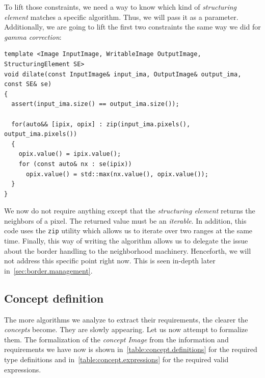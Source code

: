 To lift those constraints, we need a way to know which kind of \emph{structuring element} matches a specific algorithm.
Thus, we will pass it as a parameter. Additionally, we are going to lift the first two constraints the same way we did
for \emph{gamma correction}:

\begin{verbatim}
template <Image InputImage, WritableImage OutputImage, StructuringElement SE>
void dilate(const InputImage& input_ima, OutputImage& output_ima, const SE& se)
{
  assert(input_ima.size() == output_ima.size());

  for(auto&& [ipix, opix] : zip(input_ima.pixels(), output_ima.pixels())
  {
    opix.value() = ipix.value();
    for (const auto& nx : se(ipix))
      opix.value() = std::max(nx.value(), opix.value());
  }
}
\end{verbatim}

\noindent We now do not require anything except that the \emph{structuring element} returns the neighbors of a pixel.
The returned value must be an \emph{iterable}. In addition, this code uses the \texttt{zip} utility which allows us to
iterate over two ranges at the same time. Finally, this way of writing the algorithm allows us to delegate the issue
about the border handling to the neighborhood machinery. Henceforth, we will not address this specific point right now.
This is seen in-depth later in~\cref{sec:border.management}.

\subsection{Concept definition}
\label{subsec:concept}

The more algorithms we analyze to extract their requirements, the clearer the \emph{concepts} become. They are slowly
appearing. Let us now attempt to formalize them. The formalization of the \emph{concept Image} from the information and
requirements we have now is shown in~\cref{table:concept.definitions} for the required type definitions and
in~\cref{table:concept.expressions} for the required valid expressions.

